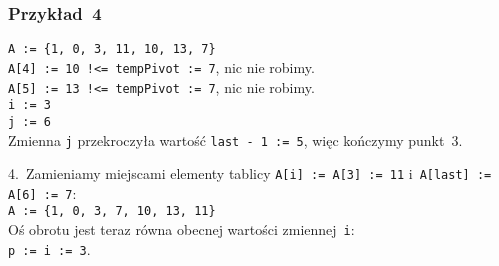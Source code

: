 \documentclass[10pt,t]{beamer}
\begin{document}
\begin{frame}
  \frametitle{Przykład~4}


  \texttt{A := \{1, 0, 3, 11, 10, 13, 7\}} \\
  \texttt{A[4] := 10 !<= tempPivot := 7}, nic nie robimy. \\
  \texttt{A[5] := 13 !<= tempPivot := 7}, nic nie robimy. \\
  \texttt{i := 3} \\
  \texttt{j := 6} \\
  Zmienna \texttt{j} przekroczyła wartość \texttt{last - 1 := 5}, więc
  kończymy punkt~$3$.

  4.~Zamieniamy miejscami elementy tablicy \texttt{A[i] := A[3] := 11}
  i~\texttt{A[last] := A[6] := 7}: \\
  \texttt{A := \{1, 0, 3, 7, 10, 13, 11\}} \\
  Oś obrotu jest teraz równa obecnej wartości zmiennej~\texttt{i}: \\
  \texttt{p := i := 3}.



\end{frame}
\end{document}
